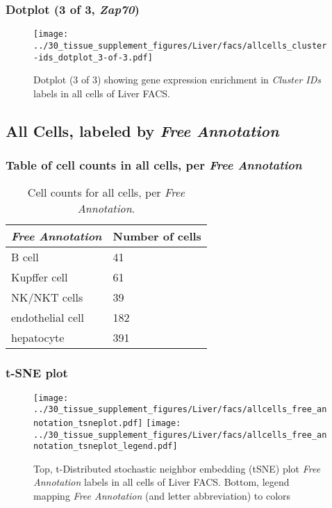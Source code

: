\clearpage

\subsubsection{Dotplot (3 of 3, \emph{Zap70})}
\begin{figure}[h]
\centering
\texttt{[image: ../30\_tissue\_supplement\_figures/Liver/facs/allcells\_cluster-ids\_dotplot\_3-of-3.pdf]}

\caption{ Dotplot (3 of 3)  showing gene expression enrichment in \emph{Cluster IDs} labels in all cells of Liver FACS. }
\end{figure}


\clearpage

\subsection{All Cells, labeled by \emph{Free Annotation}}
\subsubsection{Table of cell counts in all cells, per \emph{Free Annotation}}\begin{table}[h]
\centering
\label{my-label}
\begin{tabular}{@{}ll@{}}
\toprule

\emph{Free Annotation}& Number of cells \\ \midrule
B cell & 41 \\

Kupffer cell & 61 \\

NK/NKT cells & 39 \\

endothelial cell & 182 \\

hepatocyte & 391 \\
\bottomrule
\end{tabular}
\caption{Cell counts for all cells, per \emph{Free Annotation}.}
\end{table}

\clearpage
\subsubsection{t-SNE plot}
\begin{figure}[h]
\centering
\texttt{[image: ../30\_tissue\_supplement\_figures/Liver/facs/allcells\_free\_annotation\_tsneplot.pdf]}
\texttt{[image: ../30\_tissue\_supplement\_figures/Liver/facs/allcells\_free\_annotation\_tsneplot\_legend.pdf]}
\caption{Top, t-Distributed stochastic neighbor embedding (tSNE) plot  \emph{Free Annotation} labels in all cells of Liver FACS. Bottom, legend mapping \emph{Free Annotation} (and letter abbreviation) to colors}
\end{figure}


